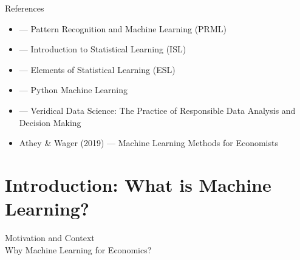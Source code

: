 \documentclass[11pt]{beamer}
\begin{document}
\begin{frame}[fragile]{References}
	\begin{itemize}
		\small
		\setlength{\itemsep}{0.15cm}
		\item \citet{Bishop2016} --- Pattern Recognition and Machine Learning (PRML)
		\item \citet{james2023IntroductionStatisticalLearning} --- Introduction to Statistical Learning (ISL)
		\item \citet{hastieElementsStatisticalLearning2009} --- Elements of Statistical Learning (ESL)
		\item \citet{raschka2019PythonMachineLearning} --- Python Machine Learning
		\item \citet{yu2024VeridicalDataScience} --- Veridical Data Science: The Practice of Responsible Data Analysis and Decision Making
		\item Athey \& Wager (2019) --- Machine Learning Methods for Economists
	\end{itemize}
\end{frame}


\section{Introduction: What is Machine Learning?}

\begin{frame}
	\begin{center}
		\Large
		Motivation and Context\\
		\vspace{0.5cm}
		\normalsize
		Why Machine Learning for Economics?
	\end{center}
\end{frame}
\end{document}

